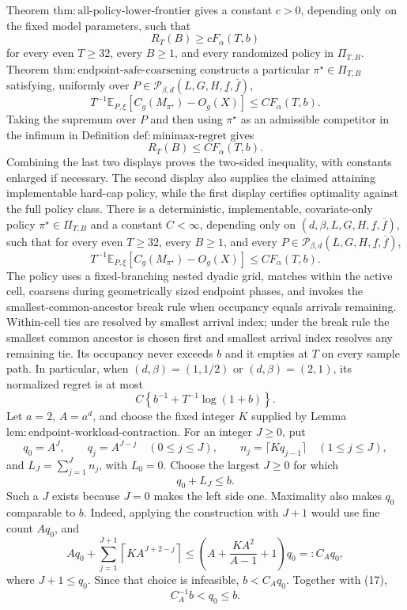 Theorem \(\mathrm{thm:all\text{-}policy\text{-}lower\text{-}frontier}\) gives a constant \(c>0\), depending only on the fixed model parameters, such that
\[
 R_T(B)\ge cF_\alpha(T,b)
\]
for every even \(T\ge32\), every \(B\ge1\), and every randomized policy in \(\Pi_{T,B}\).  Theorem \(\mathrm{thm:endpoint\text{-}safe\text{-}coarsening}\) constructs a particular \(\pi^\star\in\Pi_{T,B}\) satisfying, uniformly over \(P\in\mathcal P_{\beta,d}(L,G,H,\underline f,\overline f)\),
\[
 T^{-1}\mathbb E_{P,\xi}\!\left[C_g(M_{\pi^\star})-O_g(X)\right]
 \le C F_\alpha(T,b).
\]
Taking the supremum over \(P\) and then using \(\pi^\star\) as an admissible competitor in the infimum in Definition \(\mathrm{def:minimax\text{-}regret}\) gives
\[
 R_T(B)\le C F_\alpha(T,b).
\]
Combining the last two displays proves the two-sided inequality, with constants enlarged if necessary.  The second display also supplies the claimed attaining implementable hard-cap policy, while the first display certifies optimality against the full policy class.
There is a deterministic, implementable, covariate-only policy \(\pi^\star\in\Pi_{T,B}\) and a constant \(C<\infty\), depending only on \((d,\beta,L,G,H,\underline f,\overline f)\), such that for every even \(T\ge32\), every \(B\ge1\), and every \(P\in\mathcal P_{\beta,d}(L,G,H,\underline f,\overline f)\),
\[
 T^{-1}\mathbb E_{P,\xi}\!\left[C_g(M_{\pi^\star})-O_g(X)\right]
 \le C F_\alpha(T,b).
\]
The policy uses a fixed-branching nested dyadic grid, matches within the active cell, coarsens during geometrically sized endpoint phases, and invokes the smallest-common-ancestor break rule when occupancy equals arrivals remaining.  Within-cell ties are resolved by smallest arrival index; under the break rule the smallest common ancestor is chosen first and smallest arrival index resolves any remaining tie.  Its occupancy never exceeds \(b\) and it empties at \(T\) on every sample path.  In particular, when \((d,\beta)=(1,1/2)\) or \((d,\beta)=(2,1)\), its normalized regret is at most
\[
 C\left\{b^{-1}+T^{-1}\log(1+b)\right\}.
\]
Let \(a=2\), \(A=a^d\), and choose the fixed integer \(K\) supplied by Lemma \(\mathrm{lem:endpoint\text{-}workload\text{-}contraction}\).  For an integer \(J\ge0\), put
\[
 q_0=A^J,\qquad q_j=A^{J-j}\quad(0\le j\le J),
 \qquad n_j=\lceil Kq_{j-1}\rceil\quad(1\le j\le J),
\]
and \(L_J=\sum_{j=1}^Jn_j\), with \(L_0=0\).  Choose the largest \(J\ge0\) for which
\[
 q_0+L_J\le b. \tag{17}
\]
Such a \(J\) exists because \(J=0\) makes the left side one.  Maximality also makes \(q_0\) comparable to \(b\).  Indeed, applying the construction with \(J+1\) would use fine count \(Aq_0\), and
\[
 Aq_0+\sum_{j=1}^{J+1}\left\lceil K A^{J+2-j}\right\rceil
 \le \left(A+\frac{KA^2}{A-1}+1\right)q_0=:C_Aq_0, \tag{18}
\]
where \(J+1\le q_0\).  Since that choice is infeasible, \(b<C_Aq_0\).  Together with (17),
\[
 C_A^{-1}b<q_0\le b. \tag{19}
\]

